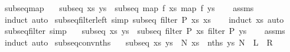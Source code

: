 \begin{isabellebody}
\isadelimproof
%
\endisadelimproof
%
\isadelimdocument
%
\endisadelimdocument
%
\isatagdocument
%
\isamarkuptrue%
%
\endisatagdocument
{\isafolddocument}%
%
\isadelimdocument
%
\endisadelimdocument
{}\isamarkupfalse%
\ subseq{\isacharunderscore}map{\isacharcolon}\isanewline
\ \ \ {\isachardoublequoteopen}subseq\ xs\ ys{\isachardoublequoteclose}\ \ {\isachardoublequoteopen}subseq\ {\isacharparenleft}map\ f\ xs{\isacharparenright}\ {\isacharparenleft}map\ f\ ys{\isacharparenright}{\isachardoublequoteclose}\isanewline
%
\isadelimproof
\ \ %
\endisadelimproof
%
\isatagproof
{}\isamarkupfalse%
\ assms\ \isamarkupfalse%
\ {\isacharparenleft}induct{\isacharparenright}\ auto%
\endisatagproof
{\isafoldproof}%
%
\isadelimproof
\isanewline
%
\endisadelimproof
\isanewline
{}\isamarkupfalse%
\ subseq{\isacharunderscore}filter{\isacharunderscore}left\ {\isacharbrackleft}simp{\isacharbrackright}{\isacharcolon}\ {\isachardoublequoteopen}subseq\ {\isacharparenleft}filter\ P\ xs{\isacharparenright}\ xs{\isachardoublequoteclose}\isanewline
%
\isadelimproof
\ \ %
\endisadelimproof
%
\isatagproof
{}\isamarkupfalse%
\ {\isacharparenleft}induct\ xs{\isacharparenright}\ auto%
\endisatagproof
{\isafoldproof}%
%
\isadelimproof
\isanewline
%
\endisadelimproof
\isanewline
{}\isamarkupfalse%
\ subseq{\isacharunderscore}filter\ {\isacharbrackleft}simp{\isacharbrackright}{\isacharcolon}\isanewline
\ \ \ {\isachardoublequoteopen}subseq\ xs\ ys{\isachardoublequoteclose}\ \ {\isachardoublequoteopen}subseq\ {\isacharparenleft}filter\ P\ xs{\isacharparenright}\ {\isacharparenleft}filter\ P\ ys{\isacharparenright}{\isachardoublequoteclose}\isanewline
%
\isadelimproof
\ \ %
\endisadelimproof
%
\isatagproof
{}\isamarkupfalse%
\ assms\ \isamarkupfalse%
\ induct\ auto%
\endisatagproof
{\isafoldproof}%
%
\isadelimproof
\isanewline
%
\endisadelimproof
\isanewline
{}\isamarkupfalse%
\ subseq{\isacharunderscore}conv{\isacharunderscore}nths{\isacharcolon}\ \isanewline
\ \ {\isachardoublequoteopen}subseq\ xs\ ys\ {\isasymlongleftrightarrow}\ {\isacharparenleft}{\isasymexists}N{\isachardot}\ xs\ {\isacharequal}\ nths\ ys\ N{\isacharparenright}{\isachardoublequoteclose}\ {\isacharparenleft}\ {\isachardoublequoteopen}{\isacharquery}L\ {\isacharequal}\ {\isacharquery}R{\isachardoublequoteclose}{\isacharparenright}\isanewline

\end{isabellebody}
